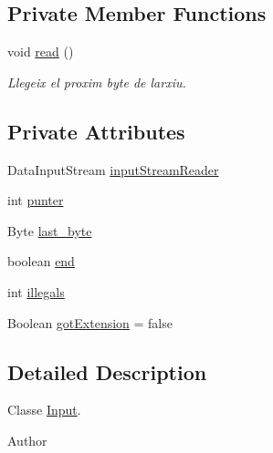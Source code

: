 \subsection*{Private Member Functions}
\begin{DoxyCompactItemize}
\item 
\mbox{\label{classpersistencia_1_1input_1_1Input_a24eae4109b4ff4954ff2d7feef2fa4e4}} 
void \hyperlink{classpersistencia_1_1input_1_1Input_a24eae4109b4ff4954ff2d7feef2fa4e4}{read} ()
\begin{DoxyCompactList}\small\item\em Llegeix el proxim byte de l\textquotesingle{}arxiu. \end{DoxyCompactList}\end{DoxyCompactItemize}
\subsection*{Private Attributes}
\begin{DoxyCompactItemize}
\item 
Data\+Input\+Stream \hyperlink{classpersistencia_1_1input_1_1Input_a7b25d54d1a6454a58275174eef12a88b}{input\+Stream\+Reader}
\item 
int \hyperlink{classpersistencia_1_1input_1_1Input_abe76388d0ac9eeafdba673ad2138f8dc}{punter}
\item 
Byte \hyperlink{classpersistencia_1_1input_1_1Input_a45d4bdcdb96823fc8ffe5c1a430727f2}{last\+\_\+byte}
\item 
boolean \hyperlink{classpersistencia_1_1input_1_1Input_aa986cd4af0178e1a80f551dcd8936125}{end}
\item 
int \hyperlink{classpersistencia_1_1input_1_1Input_ad3132949d4ac469b5f4d77373389f9f1}{illegals}
\item 
Boolean \hyperlink{classpersistencia_1_1input_1_1Input_a044330fba061b562ab4a537011c044f3}{got\+Extension} = false
\end{DoxyCompactItemize}


\subsection{Detailed Description}
Classe \hyperlink{classpersistencia_1_1input_1_1Input}{Input}. 

\begin{DoxyAuthor}{Author}

\end{DoxyAuthor}


